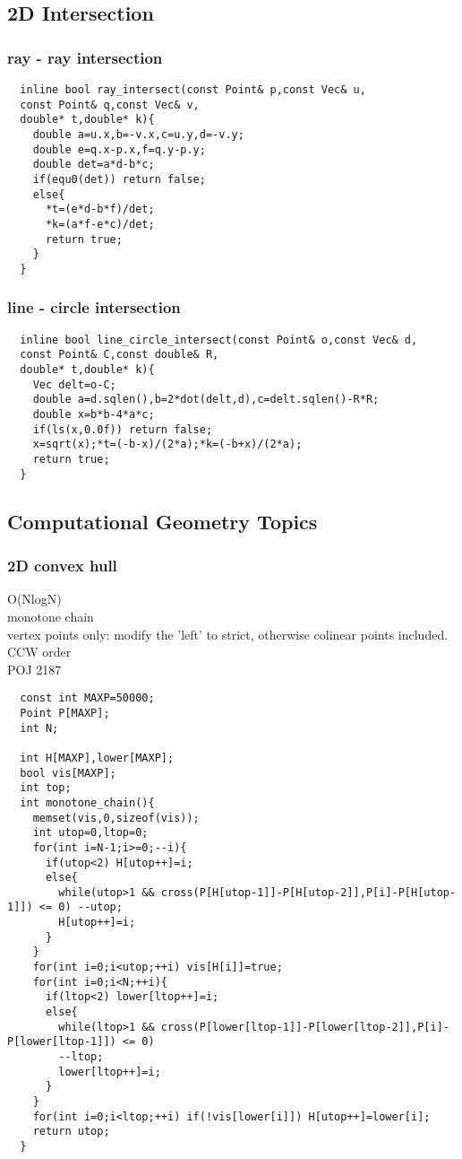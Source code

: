 \documentclass[a4paper]{article}
\begin{document}
\subsection{2D Intersection}
\subsubsection{ray - ray intersection}
\begin{lstlisting}
  inline bool ray_intersect(const Point& p,const Vec& u,
  const Point& q,const Vec& v,
  double* t,double* k){
    double a=u.x,b=-v.x,c=u.y,d=-v.y;
    double e=q.x-p.x,f=q.y-p.y;
    double det=a*d-b*c;
    if(equ0(det)) return false;
    else{
      *t=(e*d-b*f)/det;
      *k=(a*f-e*c)/det;
      return true;
    }
  }
\end{lstlisting}
\subsubsection{line - circle intersection}
\begin{lstlisting}
  inline bool line_circle_intersect(const Point& o,const Vec& d,
  const Point& C,const double& R,
  double* t,double* k){
    Vec delt=o-C;
    double a=d.sqlen(),b=2*dot(delt,d),c=delt.sqlen()-R*R;
    double x=b*b-4*a*c;
    if(ls(x,0.0f)) return false;
    x=sqrt(x);*t=(-b-x)/(2*a);*k=(-b+x)/(2*a);
    return true;
  }
\end{lstlisting}
\subsection{Computational Geometry Topics}
\subsubsection{2D convex hull}

O(NlogN) \\ 
monotone chain \\ 
vertex points only: modify the 'left' to strict, otherwise colinear points included. \\
CCW order \\
POJ 2187 \\
\begin{lstlisting}
  const int MAXP=50000;
  Point P[MAXP];
  int N;

  int H[MAXP],lower[MAXP];
  bool vis[MAXP];
  int top;
  int monotone_chain(){
    memset(vis,0,sizeof(vis));
    int utop=0,ltop=0;
    for(int i=N-1;i>=0;--i){
      if(utop<2) H[utop++]=i;
      else{
        while(utop>1 && cross(P[H[utop-1]]-P[H[utop-2]],P[i]-P[H[utop-1]]) <= 0) --utop;
        H[utop++]=i;
      }
    }
    for(int i=0;i<utop;++i) vis[H[i]]=true;
    for(int i=0;i<N;++i){
      if(ltop<2) lower[ltop++]=i;
      else{
        while(ltop>1 && cross(P[lower[ltop-1]]-P[lower[ltop-2]],P[i]-P[lower[ltop-1]]) <= 0)
        --ltop;
        lower[ltop++]=i;
      }
    }
    for(int i=0;i<ltop;++i) if(!vis[lower[i]]) H[utop++]=lower[i];
    return utop;
  }
\end{lstlisting}
\end{document}
